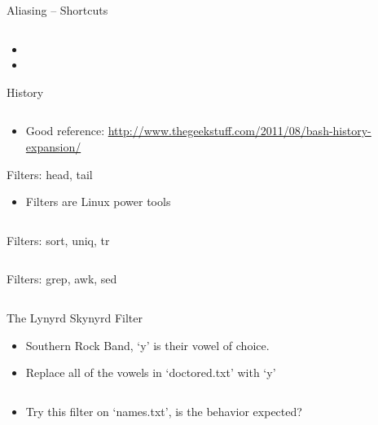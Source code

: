\documentclass[hyperref={pdfpagelabels=false},12pt]{beamer}
\begin{document}
\begin{frame}{Aliasing -- Shortcuts}
\inputminted[bgcolor=lightgray,linenos,fontsize=\footnotesize]{bash}{code/the-environment-2.txt}
\begin{itemize}
    \item \color{red}{Don't use these for ssh!}
    \item \color{red}{Don't use these in scripts!}
\end{itemize}
\end{frame}

\begin{frame}{History}
\inputminted[bgcolor=lightgray,linenos,fontsize=\footnotesize]{bash}{code/the-environment-3.txt}
\begin{itemize}
    \item Good reference: \url{http://www.thegeekstuff.com/2011/08/bash-history-expansion/}
\end{itemize}
\end{frame}

\begin{frame}{Filters: head, tail}
\begin{itemize}
    \item Filters are Linux power tools
\end{itemize}
\inputminted[bgcolor=lightgray,linenos,fontsize=\footnotesize]{bash}{code/simple-filters-1.txt}
\end{frame}

\begin{frame}{Filters: sort, uniq, tr}
\inputminted[bgcolor=lightgray,linenos,fontsize=\footnotesize]{bash}{code/simple-filters-2.txt}
\end{frame}

\begin{frame}{Filters: grep, awk, sed}
\inputminted[bgcolor=lightgray,linenos,fontsize=\footnotesize]{bash}{code/simple-filters-3.txt}
\end{frame}

\begin{frame}{The Lynyrd Skynyrd Filter}
\begin{itemize}
    \item Southern Rock Band, `y' is their vowel of choice.
    \item Replace all of the vowels in `doctored.txt' with `y'
\end{itemize}
\inputminted[bgcolor=lightgray,linenos,fontsize=\footnotesize]{bash}{code/simple-filters-4.txt}
\begin{itemize}
    \item Try this filter on `names.txt', is the behavior expected?
\end{itemize}
\end{frame}
\end{document}
